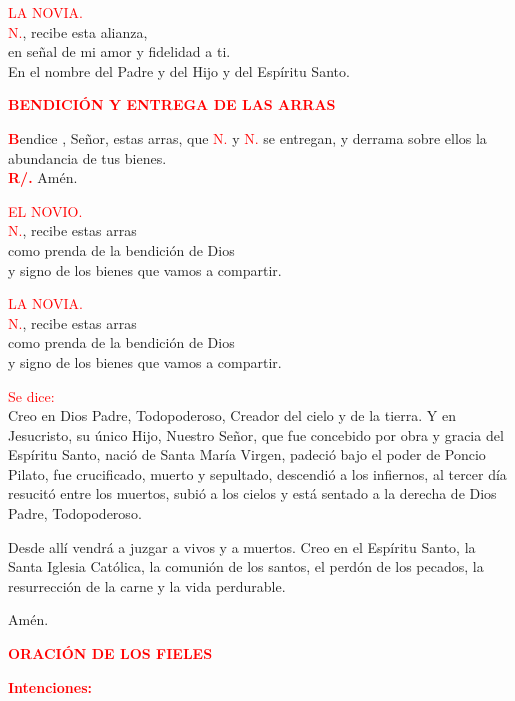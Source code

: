 \documentclass[12pt, letterpaper]{report}
\begin{document}
  \textcolor{red}{LA NOVIA.}\\
  \textcolor{red}{N.}, recibe esta alianza, \\
  en se\~nal de mi amor y fidelidad a ti. \\
  En el nombre del Padre y del Hijo y del Esp\'iritu Santo.

  \Large {\bfseries \textcolor{red}{BENDICI\'ON Y ENTREGA DE LAS ARRAS}}

  \lettrine[lines=2]{\bfseries \textcolor{red}{B}}{}endice \Huge \textcolor{red}{},  \Large Se\~nor, estas arras, que \textcolor{red}{N.} y \textcolor{red}{N.} se entregan, y derrama sobre ellos la abundancia de tus bienes.\\
  \Large {\bfseries \textcolor{red}{R/.}} \hspace{0.5cm} Am\'en.

  \textcolor{red}{EL NOVIO.}\\
  \textcolor{red}{N.}, recibe estas arras \\
  como prenda de la bendici\'on de Dios \\
  y signo de los bienes que vamos a compartir.

  \textcolor{red}{LA NOVIA.}\\
  \textcolor{red}{N.}, recibe estas arras \\
  como prenda de la bendici\'on de Dios \\
  y signo de los bienes que vamos a compartir.

  \Large {\textcolor{red}{Se dice:}}\\
  \Large Creo en Dios Padre, Todopoderoso, Creador del cielo y de la tierra. Y en Jesucristo, su único Hijo, Nuestro Señor, que fue concebido por obra y gracia del Espíritu Santo, nació de Santa María Virgen, padeció bajo el poder de Poncio Pilato, fue crucificado, muerto y sepultado, descendió a los infiernos, al tercer día resucitó entre los muertos, subió a los cielos y está sentado a la derecha de Dios Padre, Todopoderoso.

  Desde allí vendrá a juzgar a vivos y a muertos. Creo en el Espíritu Santo, la Santa Iglesia Católica, la comunión de los santos, el perdón de los pecados, la resurrección de la carne y la vida perdurable.

  Amén.

  \clearpage

  \Large {\bfseries \textcolor{red}{ORACI\'ON DE LOS FIELES}}

  \large {\bfseries \textcolor{red}{Intenciones:}}
\end{document}
